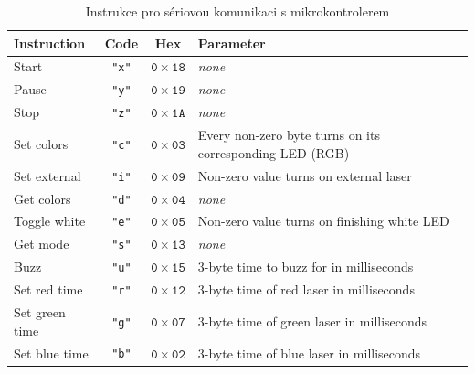 \documentclass[twoside,project]{../MFFPrace}
\begin{document}
\begin{table}[hp]
    \begin{adjustwidth}{-6em}{-3em}
        \caption{Instrukce pro sériovou komunikaci s mikrokontrolerem}
        \centering
        \begin{tabular}{|l|c|c|l|}
            \hline
            \textbf{Instruction} & \textbf{Code} & \textbf{Hex}           & \textbf{Parameter}                                        \\
            \hline
            Start                & \texttt{"x"}  & $\mathtt{0{\times}18}$ & \textit{none}                                             \\
            Pause                & \texttt{"y"}  & $\mathtt{0{\times}19}$ & \textit{none}                                             \\
            Stop                 & \texttt{"z"}  & $\mathtt{0{\times}1A}$ & \textit{none}                                             \\
            Set colors           & \texttt{"c"}  & $\mathtt{0{\times}03}$ & Every non-zero byte turns on its corresponding LED (RGB)  \\
            Set external         & \texttt{"i"}  & $\mathtt{0{\times}09}$ & Non-zero value turns on external laser                    \\
            Get colors           & \texttt{"d"}  & $\mathtt{0{\times}04}$ & \textit{none}                                             \\
            Toggle white         & \texttt{"e"}  & $\mathtt{0{\times}05}$ & Non-zero value turns on finishing white LED               \\
            Get mode             & \texttt{"s"}  & $\mathtt{0{\times}13}$ & \textit{none}                                             \\
            Buzz                 & \texttt{"u"}  & $\mathtt{0{\times}15}$ & 3-byte time to buzz for in milliseconds                   \\
            Set red time         & \texttt{"r"}  & $\mathtt{0{\times}12}$ & 3-byte time of red laser in milliseconds                  \\
            Set green time       & \texttt{"g"}  & $\mathtt{0{\times}07}$ & 3-byte time of green laser in milliseconds                \\
            Set blue time        & \texttt{"b"}  & $\mathtt{0{\times}02}$ & 3-byte time of blue laser in milliseconds                 \\

\end{tabular}
\end{adjustwidth}
\end{table}
\end{document}
